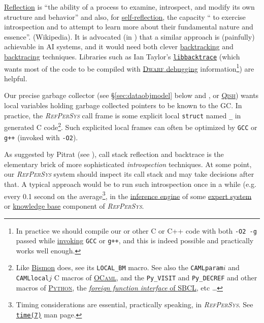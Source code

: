 \documentclass{IEEEtran}
\newcommand{\RefPerSys}{{\textit{\textsc{RefPerSys}}}}
\begin{document}
\href{https://en.wikipedia.org/wiki/Reflection_(computer_programming)}{Reflection}
is ``the ability of a process to examine, introspect, and modify its
own structure and behavior'' and also, for
\href{https://en.wikipedia.org/wiki/Self-reflection}{self-reflection},
the capacity `` to exercise introspection and to attempt to learn more
about their fundamental nature and essence''. (Wikipedia). It is
advocated (in \cite{Pitrat:2009:ArtifBeings}) that a similar approach
is (painfully) achievable in AI systems, and it would need both clever
\href{https://en.wikipedia.org/wiki/Backtracking}{backtracking} and
\href{https://en.wikipedia.org/wiki/Stack_trace}{backtracing}
techniques.
 Libraries such as Ian Taylor's
 \href{https://github.com/ianlancetaylor/libbacktrace}{\texttt{libbacktrace}}
 (which wants most of the code to be compiled with
 \href{https://en.wikipedia.org/wiki/DWARF}{\textsc{Dwarf} debugging}
 information\footnote{In practice we should compile our or other C or
 C++ code with both \texttt{-O2 -g} passed while
 \href{https://gcc.gnu.org/onlinedocs/gcc/Invoking-GCC.html}{invoking}
 \texttt{GCC} or \texttt{g++}, and this is indeed possible and
 practically works well enough.}) are helpful.

 Our precise garbage collector (see \S \ref{sec:dataobjmodel} below
 and \cite{rafkind:2009:precise-gc}, or
 \href{http://starynkevitch.net/Basile/qishintro.html}{\textsc{Qish}})
 wants local variables holding garbage collected pointers to be known
 to the GC. In practice, the {\RefPerSys} call frame is some explicit
 local \texttt{struct} named \texttt{\_} in generated C
 code\footnote{Like \href{http://github.com/bstarynk/bismon/}{Bismon}
 does, see its \texttt{LOCAL\_BM} macro. See also the
 \texttt{CAMLparam$i$} and \texttt{CAMLlocal$j$} C macros of
 \href{https://caml.inria.fr/pub/docs/manual-ocaml/intfc.htm}{\textsc{OCaml}},
 and the \texttt{Py\_VISIT} and \texttt{Py\_DECREF} and other macros
 of
 \href{https://docs.python.org/3/extending/}{\textsc{Python}}, the \href{http://www.sbcl.org/manual/index.html\#Foreign-Function-Interface}{\textit{foreign function interface} of \textsc{SBCL}}, etc \ldots}. Such
 explicited local frames can often be optimized by \texttt{GCC} or
 \texttt{g++} (invoked with \texttt{-O2}).

 As suggested by Pitrat (see \cite{Pitrat:1996:FGCS, Pitrat:2009:AST,
   Pitrat:2009:ArtifBeings}), call stack reflection and backtrace is
 the elementary brick of more sophisticated \emph{introspection}
 techniques. At some point, our {\RefPerSys} system should inspect its
 call stack and may take decisions after that. A typical approach
 would be to run such introspection once in a while (e.g. every 0.1
 second on the average\footnote{Timing considerations are essential,
 practically speaking, in \RefPerSys. See
 \href{http://man7.org/linux/man-pages/man7/time.7.html}{\texttt{time(7)}}
 man page.}, in the
 \href{https://en.wikipedia.org/wiki/Inference_engine}{inference
   engine} of some
 \href{https://en.wikipedia.org/wiki/Expert\_system}{expert system} or
 \href{https://en.wikipedia.org/wiki/Knowledge_base}{knowledge base}
 component of {\RefPerSys}.
 
\end{document}
